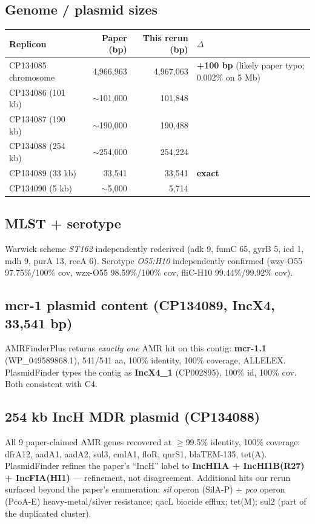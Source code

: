 \documentclass[11pt]{article}
\newcommand{\cmark}{\ding{51}}
\begin{document}
\subsection{Genome / plasmid sizes}
\begin{tabular}{@{}lrrl@{}}
\toprule
Replicon & Paper (bp) & This rerun (bp) & $\Delta$ \\
\midrule
CP134085 chromosome & 4{,}966{,}963 & 4{,}967{,}063 & \textbf{+100 bp} (likely paper typo; 0.002\% on 5 Mb) \\
CP134086 (101 kb)   & $\sim$101{,}000 & 101{,}848 & \cmark \\
CP134087 (190 kb)   & $\sim$190{,}000 & 190{,}488 & \cmark \\
CP134088 (254 kb)   & $\sim$254{,}000 & 254{,}224 & \cmark \\
CP134089 (33 kb)    & 33{,}541 & 33{,}541 & \textbf{exact} \\
CP134090 (5 kb)     & $\sim$5{,}000 & 5{,}714 & \cmark \\
\bottomrule
\end{tabular}

\subsection{MLST + serotype}
Warwick scheme \emph{ST162} independently rederived (adk 9, fumC 65, gyrB 5, icd 1, mdh 9, purA 13, recA 6).
Serotype \emph{O55:H10} independently confirmed (wzy-O55 97.75\%/100\% cov, wzx-O55 98.59\%/100\% cov,
fliC-H10 99.44\%/99.92\% cov).

\subsection{mcr-1 plasmid content (CP134089, IncX4, 33{,}541 bp)}
AMRFinderPlus returns \emph{exactly one} AMR hit on this contig: \textbf{mcr-1.1}
(WP\_049589868.1), 541/541 aa, 100\% identity, 100\% coverage, ALLELEX. PlasmidFinder types the
contig as \textbf{IncX4\_1} (CP002895), 100\% id, 100\% cov. Both consistent with C4.

\subsection{254 kb IncH MDR plasmid (CP134088)}
All 9 paper-claimed AMR genes recovered at $\geq$99.5\% identity, 100\% coverage:
dfrA12, aadA1, aadA2, sul3, cmlA1, floR, qnrS1, blaTEM-135, tet(A). PlasmidFinder refines the
paper's ``IncH'' label to \textbf{IncHI1A + IncHI1B(R27) + IncFIA(HI1)} --- refinement, not
disagreement. Additional hits our rerun surfaced beyond the paper's enumeration:
\emph{sil} operon (SilA-P) + \emph{pco} operon (PcoA-E) heavy-metal/silver resistance;
qacL biocide efflux; tet(M); sul2 (part of the duplicated cluster).
\end{document}
